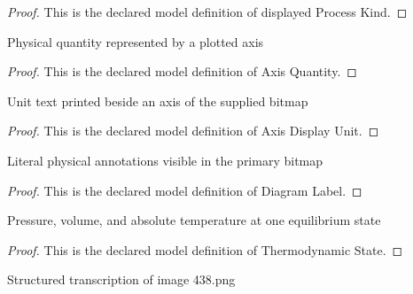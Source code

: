\begin{proof}
  This is the declared model definition of displayed Process Kind.
\end{proof}
\begin{definition}
  \label{def:physics:phyx-mini-0438:phyxminiproblems-problemphyxmini0438-axisquantity}
  Physical quantity represented by a plotted axis
\end{definition}
\begin{proof}
  This is the declared model definition of Axis Quantity.
\end{proof}
\begin{definition}
  \label{def:physics:phyx-mini-0438:phyxminiproblems-problemphyxmini0438-axisdisplayunit}
  Unit text printed beside an axis of the supplied bitmap
\end{definition}
\begin{proof}
  This is the declared model definition of Axis Display Unit.
\end{proof}
\begin{definition}
  \label{def:physics:phyx-mini-0438:phyxminiproblems-problemphyxmini0438-diagramlabel}
  Literal physical annotations visible in the primary bitmap
\end{definition}
\begin{proof}
  This is the declared model definition of Diagram Label.
\end{proof}
\begin{definition}
  \label{def:physics:phyx-mini-0438:phyxminiproblems-problemphyxmini0438-thermodynamicstate}
  Pressure, volume, and absolute temperature at one equilibrium state
\end{definition}
\begin{proof}
  This is the declared model definition of Thermodynamic State.
\end{proof}
\begin{definition}
  \label{def:physics:phyx-mini-0438:phyxminiproblems-problemphyxmini0438-dieselpvdiagram}
  Structured transcription of image 438.png
\end{definition}

